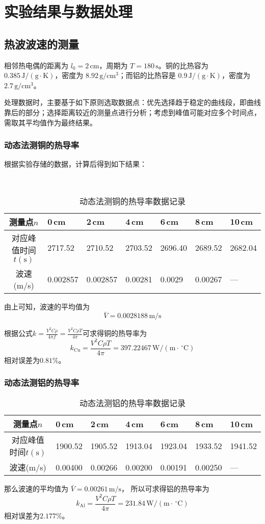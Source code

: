 \documentclass[UTF-8,twoside,cs4size]{ctexart}
\begin{document}
\section{实验结果与数据处理}
\subsection{热波波速的测量}
相邻热电偶的距离为 $l_0=2\,\mathrm{cm}$，周期为 $T=180\,\mathrm{s}$。铜的比热容为 $0.385\,\mathrm{J/(g\cdot K)}$，密度为 $8.92\,\mathrm{g/cm^3}$；而铝的比热容是 $0.9\,\mathrm{J/(g\cdot K)}$，密度为 $2.7\,\mathrm{g/cm^3}$。\par
处理数据时，主要基于如下原则选取数据点：优先选择趋于稳定的曲线段，即曲线靠后的部分；选择距离较近的测量点进行分析；考虑到峰值可能对应多个时间点，需取其平均值作为最终结果。
\subsubsection{动态法测铜的热导率}
根据实验存储的数据，计算后得到如下结果：
\begin{table}[!h]
    \centering
    \renewcommand\arraystretch{1.5}
    ~\
    
    \caption{动态法测铜的热导率数据记录}
    
    \begin{tabularx}{\textwidth}{|c|Y|Y|Y|Y|Y|Y|}
        \hline
        测量点$ n $&0\,cm&2\,cm&4\,cm&6\,cm&8\,cm&10\,cm\\
        \hline
        对应峰值时间$ t(\mathrm s) $&2717.52&2710.52&2703.52&2696.40&2689.52&2682.04\\
        \hline
        波速(m/s)&0.002857&0.002857&0.00281&0.0029&0.00267&—\\
        \hline
    \end{tabularx}
\end{table}
由上可知，波速的平均值为
	\[\bar V = 0.0028188\,\mathrm{m/s}\]
	
	根据公式$ k=\frac{V^2C\rho}{4\pi f}=\frac{V^2C\rho T}{4\pi} $可求得铜的热导率为
        \[k_{\mathrm{Cu}}=\frac{V^2C\rho T}{4\pi}=397.22467\,\mathrm{W/(m\cdot\,^\circ \mathrm{C})}\]
    相对误差为$0.81 \%$。

\subsubsection{动态法测铝的热导率}
\begin{table}[!h]
	\centering
	\renewcommand\arraystretch{1.5}
	\caption{动态法测铝的热导率数据记录}
	\begin{tabularx}{\textwidth}{|c|Y|Y|Y|Y|Y|Y|}
		\hline
		测量点$ n $&0\,cm&2\,cm&4\,cm&6\,cm&8\,cm&10\,cm\\
		\hline
		对应峰值时间$ t(\mathrm s) $&1900.52&1905.52&1913.04&1923.04&1933.52&1941.52\\
		\hline
		波速(m/s)&0.00400&0.00266&0.00200&0.00191&0.00250&—\\
		\hline
	\end{tabularx}
	\end{table}
	那么波速的平均值为
	\(\bar V=0.00261\,\mathrm{m/s}\)，
	所以可求得铝的热导率为
	\[k_{\mathrm{Al}}=\frac{V^2C\rho T}{4\pi}=231.84\,\mathrm{W/(m\cdot\,^\circ \mathrm{C})}\]
    相对误差为$2.177 \%$。
\end{document}

